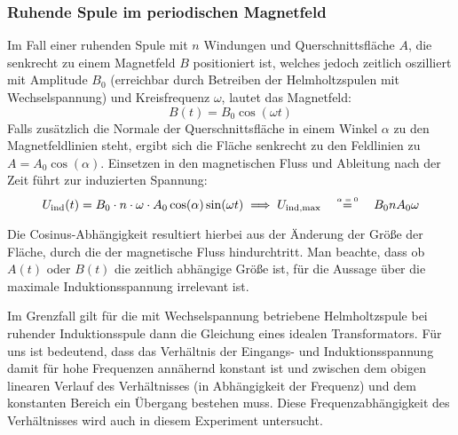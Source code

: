 \subsubsection{Ruhende Spule im periodischen Magnetfeld}
Im Fall einer ruhenden Spule mit \( n \) Windungen und Querschnittsfläche \( A \), die senkrecht zu einem Magnetfeld \( B \) positioniert ist, welches jedoch zeitlich oszilliert mit Amplitude \( B_0 \) (erreichbar durch Betreiben der Helmholtzspulen mit Wechselspannung) und Kreisfrequenz \( \omega \), lautet das Magnetfeld:
\begin{equation} \label{eq:periodic_field}
    B(t) = B_0 \cos(\omega t)
\end{equation}
Falls zusätzlich die Normale der Querschnittsfläche in einem Winkel \( \alpha \) zu den Magnetfeldlinien steht, ergibt sich die Fläche senkrecht zu den Feldlinien zu \( A = A_0 \cos(\alpha) \). Einsetzen in den magnetischen Fluss und Ableitung nach der Zeit führt zur induzierten Spannung:
\begin{equation} \label{eq:voltage_periodic}
    U_{\text{ind}}(t) = B_0 \cdot n \cdot \omega \cdot A_0 \cos(\alpha) \sin(\omega t)\implies U_\text{ind,max}\quad\mathrel{ \overset{\mbox{\normalfont\tiny\sffamily \(\alpha=0\)}}{ \underset{\mbox{\normalfont\tiny\sffamily }}{=} } }\quad B_0nA_0\omega
\end{equation}
Die Cosinus-Abhängigkeit resultiert hierbei aus der Änderung der Größe der Fläche, durch die der magnetische Fluss hindurchtritt. Man beachte, dass ob \(A(t)\) oder \(B(t)\) die zeitlich abhängige Größe ist, für die Aussage über die maximale Induktionsspannung irrelevant ist.  

Im Grenzfall gilt für die mit Wechselspannung betriebene Helmholtzspule bei ruhender Induktionsspule dann die Gleichung eines idealen Transformators. Für uns ist bedeutend, dass das Verhältnis der Eingangs- und Induktionsspannung damit für hohe Frequenzen annähernd konstant ist und zwischen dem obigen linearen Verlauf des Verhältnisses (in Abhängigkeit der Frequenz) und dem konstanten Bereich ein Übergang bestehen muss. Diese Frequenzabhängigkeit des Verhältnisses wird auch in diesem Experiment untersucht. 

